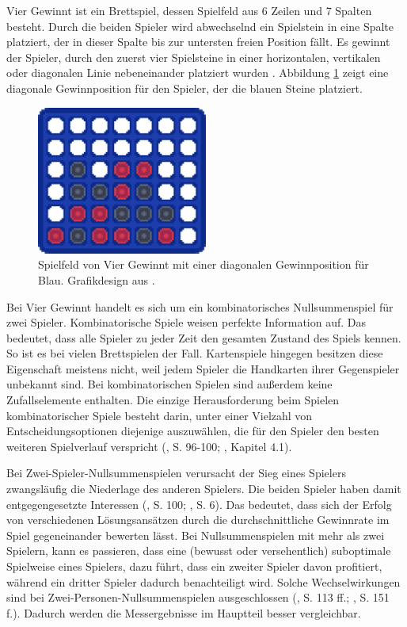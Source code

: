 \label{vier-gewinnt}

Vier Gewinnt ist ein Brettspiel, dessen Spielfeld aus 6 Zeilen und 7 Spalten besteht. Durch die beiden Spieler wird abwechselnd ein Spielstein in eine Spalte platziert, der in dieser Spalte bis zur untersten freien Position fällt. Es gewinnt der Spieler, durch den zuerst vier Spielsteine in einer horizontalen, vertikalen oder diagonalen Linie nebeneinander platziert wurden \cite{MiltonBradleyCompany.1990}. Abbildung \ref{fig:f23} zeigt eine diagonale Gewinnposition für den Spieler, der die blauen Steine platziert.

\begin{figure}
	\includegraphics[width=0.5\textwidth, center]{Bilder/connect-four-boards/win-for-blue.png}
	\caption[Spielfeld von Vier Gewinnt mit einer diagonalen Gewinnposition für Blau.]{Spielfeld von Vier Gewinnt mit einer diagonalen Gewinnposition für Blau. Grafikdesign aus \cite{Farama.2025}.}
	\label{fig:f23}
\end{figure}

Bei Vier Gewinnt handelt es sich um ein kombinatorisches Nullsummenspiel für zwei Spieler. Kombinatorische Spiele weisen \glqq perfekte Information\grqq{} auf. Das bedeutet, dass alle Spieler zu jeder Zeit den gesamten Zustand des Spiels kennen. So ist es bei vielen Brettspielen der Fall. Kartenspiele hingegen besitzen diese Eigenschaft meistens nicht, weil jedem Spieler die Handkarten ihrer Gegenspieler unbekannt sind. Bei kombinatorischen Spielen sind außerdem keine Zufallselemente enthalten. Die einzige Herausforderung beim Spielen kombinatorischer Spiele besteht darin, unter einer Vielzahl von Entscheidungsoptionen diejenige auszuwählen, die für den Spieler den besten weiteren Spielverlauf verspricht (\cite{Bewersdorff.2018}, S. 96-100; \cite{Ferguson.January2019}, Kapitel 4.1).

Bei Zwei-Spieler-Nullsummenspielen verursacht der Sieg eines Spielers zwangsläufig die Niederlage des anderen Spielers. Die beiden Spieler haben damit entgegengesetzte Interessen (\cite{Bewersdorff.2018}, S. 100; \cite{Allis.1994}, S. 6). Das bedeutet, dass sich der Erfolg von verschiedenen Lösungsansätzen durch die durchschnittliche Gewinnrate im Spiel gegeneinander bewerten lässt. Bei Nullsummenspielen mit mehr als zwei Spielern, kann es passieren, dass eine (bewusst oder versehentlich) suboptimale Spielweise eines Spielers, dazu führt, dass ein zweiter Spieler davon profitiert, während ein dritter Spieler dadurch benachteiligt wird. Solche Wechselwirkungen sind bei Zwei-Personen-Nullsummenspielen ausgeschlossen (\cite{Bewersdorff.2018}, S. 113 ff.; \cite{Russell.2020}, S. 151 f.). Dadurch werden die Messergebnisse im Hauptteil besser vergleichbar.


